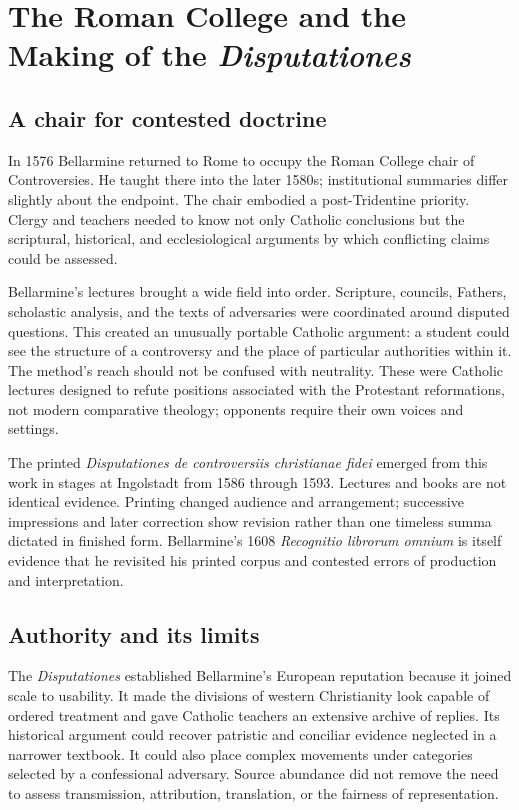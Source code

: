 \section{The Roman College and the Making of the \emph{Disputationes}}

\subsection{A chair for contested doctrine}

In 1576 Bellarmine returned to Rome to occupy the Roman College chair of
Controversies.  He taught there into the later 1580s; institutional summaries
differ slightly about the endpoint.  The chair embodied a post-Tridentine
priority.  Clergy and teachers needed to know not only Catholic conclusions
but the scriptural, historical, and ecclesiological arguments by which
conflicting claims could be assessed.

Bellarmine's lectures brought a wide field into order.  Scripture, councils,
Fathers, scholastic analysis, and the texts of adversaries were coordinated
around disputed questions.  This created an unusually portable Catholic
argument: a student could see the structure of a controversy and the place of
particular authorities within it.  The method's reach should not be confused
with neutrality.  These were Catholic lectures designed to refute positions
associated with the Protestant reformations, not modern comparative theology;
opponents require their own voices and settings.

The printed \emph{Disputationes de controversiis christianae fidei} emerged
from this work in stages at Ingolstadt from 1586 through 1593.  Lectures and
books are not identical evidence.  Printing changed audience and arrangement;
successive impressions and later correction show revision rather than one
timeless summa dictated in finished form.  Bellarmine's 1608
\emph{Recognitio librorum omnium} is itself evidence that he revisited his
printed corpus and contested errors of production and interpretation.

\subsection{Authority and its limits}

The \emph{Disputationes} established Bellarmine's European reputation because
it joined scale to usability.  It made the divisions of western Christianity
look capable of ordered treatment and gave Catholic teachers an extensive
archive of replies.  Its historical argument could recover patristic and
conciliar evidence neglected in a narrower textbook.  It could also place
complex movements under categories selected by a confessional adversary.
Source abundance did not remove the need to assess transmission, attribution,
translation, or the fairness of representation.

